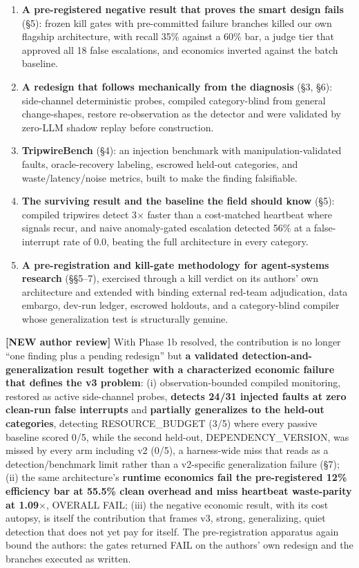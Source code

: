 \documentclass[acmsmall,screen,review,anonymous]{acmart}
\renewenvironment{leftbar}{%
  \def\FrameCommand{\hspace{2pt}{\color{lbcol}\vrule width 1.5pt}\hspace{8pt}}%
  \MakeFramed{\advance\hsize-\width \FrameRestore}\small}%
  {\endMakeFramed}
\begin{document}
\begin{enumerate}[resume]
  \item \textbf{A pre-registered negative result that proves the smart design fails} (\S5): frozen kill gates with pre-committed failure branches killed our own flagship architecture, with recall 35\% against a 60\% bar, a judge tier that approved all 18 false escalations, and economics inverted against the batch baseline.
  \item \textbf{A redesign that follows mechanically from the diagnosis} (\S3, \S6): side-channel deterministic probes, compiled category-blind from general change-shapes, restore re-observation as the detector and were validated by zero-LLM shadow replay before construction.
  \item \textbf{TripwireBench} (\S4): an injection benchmark with manipulation-validated faults, oracle-recovery labeling, escrowed held-out categories, and waste/latency/noise metrics, built to make the finding falsifiable.
  \item \textbf{The surviving result and the baseline the field should know} (\S5): compiled tripwires detect 3$\times$ faster than a cost-matched heartbeat where signals recur, and naive anomaly-gated escalation detected 56\% at a false-interrupt rate of 0.0, beating the full architecture in every category.
  \item \textbf{A pre-registration and kill-gate methodology for agent-systems research} (\S\S5--7), exercised through a kill verdict on its authors' own architecture and extended with binding external red-team adjudication, data embargo, dev-run ledger, escrowed holdouts, and a category-blind compiler whose generalization test is structurally genuine.
\end{enumerate}
\begin{leftbar}
\textbf{[NEW \textperiodcentered{} author review]} With Phase 1b resolved, the contribution is no longer ``one finding plus a pending redesign'' but \textbf{a validated detection-and-generalization result together with a characterized economic failure that defines the v3 problem}: (i) observation-bounded compiled monitoring, restored as active side-channel probes, \textbf{detects 24/31 injected faults at zero clean-run false interrupts} and \textbf{partially generalizes to the held-out categories}, detecting RESOURCE\_BUDGET (3/5) where every passive baseline scored 0/5, while the second held-out, DEPENDENCY\_VERSION, was missed by every arm including v2 (0/5), a harness-wide miss that reads as a detection/benchmark limit rather than a v2-specific generalization failure (\S7); (ii) the same architecture's \textbf{runtime economics fail the pre-registered 12\% efficiency bar at 55.5\% clean overhead and miss heartbeat waste-parity at 1.09$\times$}, OVERALL FAIL; (iii) the negative economic result, with its cost autopsy, is itself the contribution that frames v3, strong, generalizing, quiet detection that does not yet pay for itself. The pre-registration apparatus again bound the authors: the gates returned FAIL on the authors' own redesign and the branches executed as written.

\end{leftbar}
\end{document}
